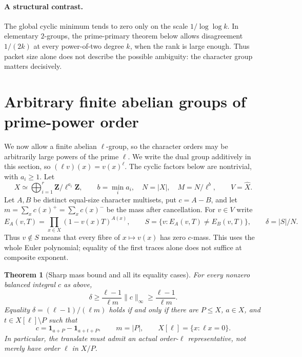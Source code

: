 \documentclass[11pt]{article}
\newtheorem{theorem}{Theorem}[section]
\theoremstyle{definition}
\theoremstyle{remark}
\begin{document}
\paragraph{A structural contrast.} The global cyclic minimum tends to zero only on the scale $1/\log\log k$. In elementary $2$-groups, the prime-primary theorem below allows disagreement $1/(2k)$ at every power-of-two degree $k$, when the rank is large enough. Thus packet size alone does not describe the possible ambiguity: the character group matters decisively.


\section{Arbitrary finite abelian groups of prime-power order}
\label{sec:primary}

We now allow a finite abelian $\ell$-group, so the character
orders may be arbitrarily large powers of the prime $\ell$. We write the dual group additively in this section, so $(\ell v)(x)=v(x)^\ell$. The cyclic factors below are nontrivial, with $a_i\ge1$. Let
\[
 X\simeq\bigoplus_{i=1}^{r}\mathbf Z/\ell^{a_i}\mathbf Z,
 \qquad b=\min_i a_i,\quad N=|X|,\quad M=N/\ell^b,
 \qquad V=\widehat X.
\]
Let $A,B$ be distinct equal-size character multisets, put $c=A-B$, and
let $m=\sum_x c(x)^+=\sum_x c(x)^-$ be the mass after cancellation.
For $v\in V$ write
\[
 E_A(v,T)=\prod_{x\in X}(1-v(x)T)^{A(x)},\qquad
 S=\{v:E_A(v,T)\ne E_B(v,T)\},\qquad \delta=|S|/N.
\]
Thus $v\notin S$ means that every fibre of $x\mapsto v(x)$ has zero
$c$-mass.  This uses the whole Euler polynomial; equality of the first
traces alone does not suffice at composite exponent.

\begin{theorem}[Sharp mass bound and all its equality cases]
\label{thm:primary-mass}
For every nonzero balanced integral $c$ as above,
\[
 \delta\ge \frac{\ell-1}{\ell m}\|c\|_\infty
 \ge\frac{\ell-1}{\ell m}.
\]
Equality $\delta=(\ell-1)/(\ell m)$ holds if and only if there are $P\le X$,
$a\in X$, and $t\in X[\ell]\setminus P$ such that
\[
 c=\mathbf1_{a+P}-\mathbf1_{a+t+P},\qquad m=|P|,
 \qquad X[\ell]=\{x:\ell x=0\}.
\]
In particular, the translate must admit an actual order-$\ell$
representative, not merely have order $\ell$ in $X/P$.
\end{theorem}
\end{document}
